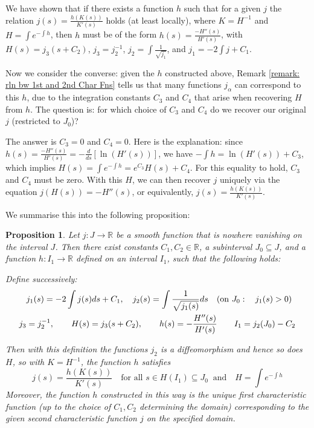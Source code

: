 \documentclass[12pt]{article}
\theoremstyle{plain}
\newtheorem{proposition}[theorem]{Proposition}
\theoremstyle{definition}
\theoremstyle{remark}
\begin{document}
We have shown that if there exists a function \(h\) such that for a given \(j\) the relation \(j(s) = \frac{h(K(s))}{K'(s)}\) holds (at least locally), where \(K = H^{-1}\) and \(H = \int e^{-\int h}\), then \(h\) must be of the form \(h(s) = \frac{-H''(s)}{H'(s)}\), with \(H(s) = j_3(s + C_2)\), \(j_3 = j_2^{-1}\), \(j_2 = \int \frac{1}{\sqrt{j_1}}\), and \(j_1 = -2\int j + C_1\).

Now we consider the converse: given the \(h\) constructed above, Remark \ref{remark: rln bw 1st and 2nd Char Fns} tells us that many functions \(j_{\alpha}\) can correspond to this \(h\), due to the integration constants \(C_3\) and \(C_4\) that arise when recovering \(H\) from \(h\). The question is: for which choice of \(C_3\) and \(C_4\) do we recover our original \(j\) (restricted to \(J_0\))?

The answer is \(C_3 = 0\) and \(C_4 = 0\). Here is the explanation: since \(h(s) = \frac{-H''(s)}{H'(s)} = -\frac{d}{ds}[\ln(H'(s))]\), we have \(-\int h = \ln(H'(s)) + C_3\), which implies \(H(s) = \int e^{-\int h} = e^{C_3} H(s) + C_4\). For this equality to hold, \(C_3\) and \(C_4\) must be zero. With this \(H\), we can then recover \(j\) uniquely via the equation \(j(H(s)) = -H''(s)\), or equivalently, \(j(s) = \frac{h(K(s))}{K'(s)}\).
 
We summarise this into the following proposition:
\begin{proposition}
	Let \( j: J \to \mathbb{R} \) be a smooth function that is nowhere vanishing on the interval \( J \). Then there exist constants \( C_1, C_2 \in \mathbb{R} \), a subinterval \( J_0 \subseteq J \), and a function \( h: I_1 \to \mathbb{R} \) defined on an interval \( I_1 \), such that the following holds:
	
	Define successively:
	\begin{align*}
		&j_1(s) = -2 \int j(s) ds + C_1, \quad	j_2(s)= \int \frac{1}{\sqrt{j_1(s)}} ds \quad \text{(on \( J_0: \) \;\; \(j_1(s)>0\))}\\
		j_3 &= j_2^{-1},\quad\quad H(s) = j_3(s + C_2), \quad\quad h(s)= -\frac{H''(s)}{H'(s)} \quad\quad I_1 = j_2(J_0)- C_2
	\end{align*}
	
	Then with this definition the functions \(j_2\) is a diffeomorphism and hence so does \(H\), so with \( K = H^{-1} \), the function \( h \) satisfies
	\[
	j(s) = \frac{h(K(s))}{K'(s)} \quad \text{for all } s \in H(I_1) \subseteq J_0 \;\; \text{and} \quad H = \int e^{-\int h}
	\]
	Moreover, the function \( h \) constructed in this way is the unique first characteristic function (up to the choice of \( C_1, C_2 \) determining the domain) corresponding to the given second characteristic function \( j \) on the specified domain.
\end{proposition}
\end{document}
